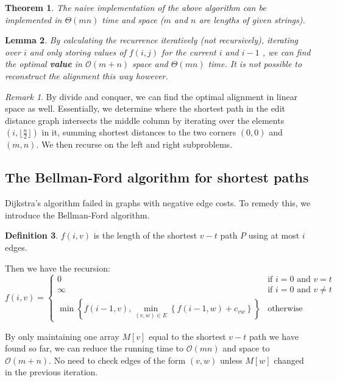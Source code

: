\documentclass[10pt, oneside, reqno]{amsart}
\theoremstyle{plain}%
\newtheorem{thm}{Theorem}[section]
\newtheorem{lem}[thm]{Lemma}
\theoremstyle{definition}
\newtheorem{defn}[thm]{Definition}
\theoremstyle{remark}
\newtheorem*{rem}{Remark}
\newcommand{\bigo}[1]{\mathcal{O}(#1)}
\begin{document}
\begin{thm}
    The naive implementation of the above algorithm can be implemented in $\Theta(mn)$ time and space  ($m$ and $n$ are lengths of given strings).
\end{thm}

\begin{lem}
    By calculating the recurrence iteratively (not recursively), iterating over $i$ and only storing values of $f(i, j)$ for the current $i$ and $i-1$ , we can find the optimal \textbf{value} in $\bigo{m+n}$ space and $\Theta(m n)$ time. It is not possible to reconstruct the alignment this way however.
\end{lem}

\begin{rem}
    By divide and conquer, we can find the optimal alignment in linear space as well. Essentially, we determine where the shortest path in the edit distance graph intersects the middle column by iterating over the elements $(i, \lfloor \frac{n}{2} \rfloor)$ in it, summing shortest distances to the two corners $(0, 0)$ and $(m, n)$. We then recurse on the left and right subproblems.
\end{rem}

\subsection{The Bellman-Ford algorithm for shortest paths} %
\label{sub:the_bellman_ford_algorithm_for_shortest_paths}

Dijkstra's algorithm failed in graphs with negative edge costs.  To remedy this, we introduce the Bellman-Ford algorithm.

\begin{defn}
    $f(i,v)$ is the length of the shortest $v-t$ path $P$ using at most $i$ edges.
\end{defn}

Then we have the recursion:
\[
    f(i,v) = \begin{cases}
        0                       &\text{if $i = 0$ and $v=t$}\\
        \infty                  &\text{if $i = 0$ and $v \neq t$}\\
        \min \left\{ f(i-1,v), \displaystyle\min_{(v,w)\in E} \left\{f(i-1,w) + c_{vw}\right\} \right\} &\text{otherwise}
    \end{cases}
\]

By only maintaining one array $M[v]$ equal to the shortest $v-t$ path we have found so far, we can reduce the running time to $\bigo{mn}$ and space to $\bigo{m+n}$.
No need to check edges of the form $(v,w)$ unless $M[w]$ changed in the previous iteration.
\end{document}
